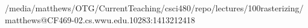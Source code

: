 /media/matthews/OTG/CurrentTeaching/csci480/repo/lectures/100rasterizing/matthews@CF469-02.cs.wwu.edu.10283:1413212418